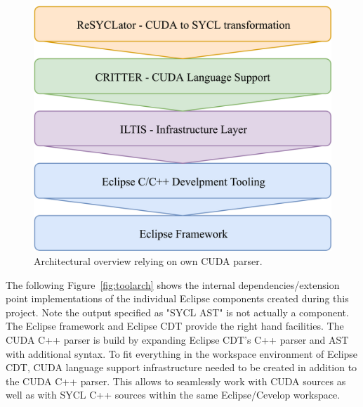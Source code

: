 \documentclass[sigconf]{acmart}
\begin{document}
\begin{figure}[h]
  \centering
  \includegraphics[width=\linewidth]{SimpleArchitectureCRITTER}
  \caption{Architectural overview relying on own CUDA parser.}
  \label{fig:resultarch}
\end{figure}

The following Figure~\ref{fig:toolarch} shows the internal dependencies/extension point implementations of the individual Eclipse components created during this project. Note the output specified as "SYCL AST" is not actually a component. The Eclipse framework and Eclipse CDT provide the right hand facilities. The CUDA C++ parser is build by expanding Eclipse CDT's C++ parser and AST with additional syntax. To fit everything in the workspace environment of Eclipse CDT, CUDA language support infrastructure needed to be created in addition to the CUDA C++ parser. This allows to seamlessly work with CUDA sources as well as with SYCL C++ sources within the same Eclipse/Cevelop workspace.
\end{document}
